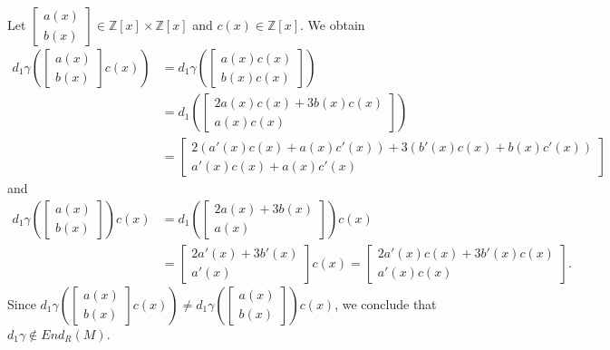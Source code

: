 \documentclass{arxiv}
\begin{document}
\begin{example}
    
    Let $\begin{bmatrix}
        a(x)\\
        b(x)
    \end{bmatrix} \in \mathbb{Z}[x] \times \mathbb{Z}[x]$ and $c(x) \in \mathbb{Z}[x]$. We obtain
    \begin{align*}
        d_1\gamma \left( \begin{bmatrix}
            a(x)\\
            b(x)
        \end{bmatrix} c(x) \right) &= d_1 \gamma \left( \begin{bmatrix}
            a(x)c(x)\\
            b(x)c(x)
        \end{bmatrix} \right) \\
        &= d_1 \left( \begin{bmatrix}
        2a(x)c(x)+3b(x)c(x)\\
        a(x)c(x)
        \end{bmatrix} \right) \\
        &= \begin{bmatrix}
            2(a'(x)c(x)+a(x)c'(x))+3(b'(x)c(x)+b(x)c'(x))\\
            a'(x)c(x)+a(x)c'(x)
        \end{bmatrix}
    \end{align*}
    and
    \begin{align*}
        d_1 \gamma \left( \begin{bmatrix}
            a(x)\\
            b(x)
        \end{bmatrix} \right) c(x) &= d_1 \left( \begin{bmatrix}
            2a(x)+3b(x)\\
            a(x)
        \end{bmatrix} \right)c(x)\\
        &= \begin{bmatrix}
            2a'(x)+3b'(x)\\
            a'(x)
        \end{bmatrix} c(x) = \begin{bmatrix}
            2a'(x)c(x)+3b'(x)c(x)\\
            a'(x)c(x)
        \end{bmatrix}.
    \end{align*}
    Since $ d_1\gamma \left( \begin{bmatrix}
            a(x)\\
            b(x)
        \end{bmatrix} c(x) \right) \ne  d_1 \gamma \left( \begin{bmatrix}
            a(x)\\
            b(x)
        \end{bmatrix} \right) c(x) $, we conclude that $d_1 \gamma \notin End_R(M)$.
\end{example}
\end{document}
